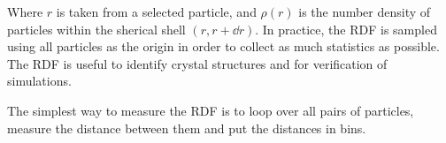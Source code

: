 Where $r$ is taken from a selected particle, and $\rho(r)$ is the number density of particles within the sherical shell $(r, r+\dd r)$. In practice, the RDF is sampled using all particles as the origin in order to collect as much statistics as possible. The RDF is useful to identify crystal structures and for verification of simulations. 

The simplest way to measure the RDF is to loop over all pairs of particles, measure the distance between them and put the distances in bins.


\begin{comment}
\subsection{SETTLE}
The basic idea of the SETTLE algorithm is to use the positions on a triangle before, $\Delta A_0 B_0 C_0$, and after, $\Delta A_1 B_1 C_1$, an unconstrained integration step to determine rotation operations to perform on $\Delta A_0 B_0 C_0$ to achieve a triangle $\Delta A_3 B_3 C_3$ corresponding to a constrained integration step. When we know the rotation operations, we also know the positions $(A_3, B_3, C_3)$ which are what we want for an implementation of the algorithm.

Let us look at the water molecule as a triangle placed in the $X'Y'$ plane of an orthogonal coordinate system $X'Y'Z'$	with the center of mass in the origin, and the oxygen atom placed on the positive y-axis. We denote the triangle $\Delta abc$ beginning with $a$ being the position of oxygen, and $b$ and $c$ the hydrogen positions in the positive direction of rotation around the origin.  In this coordinate system, the triangle is uniquely defined by three numbers: $(r_a, r_b, r_c)$ being the position components $a_y$, $-b_y$ and $c_x$. Triangles denoted by lowercase letters are the canonical water molecule, or the equilibrium configuration. $\Delta ABC$ is a triangle with possibly any positions of the corners, on which we want to perform the contrain operation to get back to the canonical triangle. 

The main derivation of the settle algorithm involve four planes, $\pi_0, \pi_A, \pi_B, \pi_C$ and the assumption that displacement vector for each apex from the unconstrained to the constrained triangle should be parallell to the plane $\pi_0$ of the triangle before the integration step. 


\end{comment}
